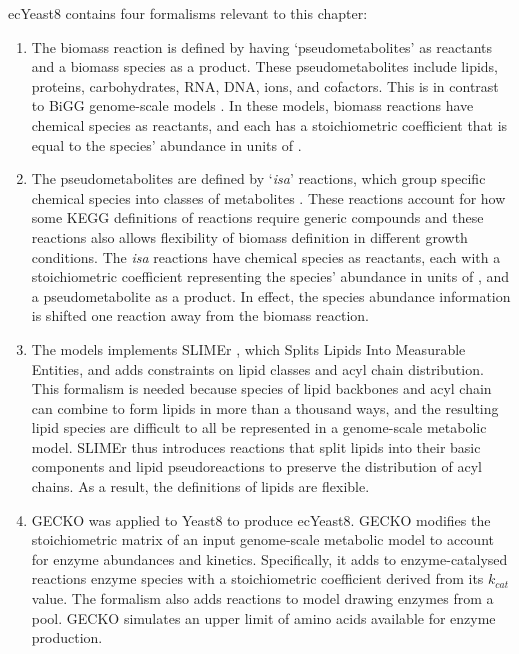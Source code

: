 ecYeast8 contains four formalisms relevant to this chapter:
\begin{enumerate}
  \item
        The biomass reaction is defined by having `pseudometabolites' as reactants and a biomass species as a product.
        These pseudometabolites include lipids, proteins, carbohydrates, RNA, DNA, ions, and cofactors.
        This is in contrast to BiGG genome-scale models \parencite{norsigianBiGGModels20202020}.
        In these models, biomass reactions have chemical species as reactants, and each has a stoichiometric coefficient that is equal to the species' abundance in units of \SI{}{\mmolgdw}.
  \item
        The pseudometabolites are defined by `\textit{isa}' reactions, which group specific chemical species into classes of metabolites \parencite{heavnerYeastExpandedReconstruction2012}.
        These reactions account for how some KEGG definitions of reactions require generic compounds and these reactions also allows flexibility of biomass definition in different growth conditions.
        The \textit{isa} reactions have chemical species as reactants, each with a stoichiometric coefficient representing the species' abundance in units of \SI{}{\mmolgdw}, and a pseudometabolite as a product.
        In effect, the species abundance information is shifted one reaction away from the biomass reaction.
  \item
        The models implements SLIMEr \parencite{sanchezSLIMErProbingFlexibility2019}, which Splits Lipids Into Measurable Entities, and adds constraints on lipid classes and acyl chain distribution.
        This formalism is needed because species of lipid backbones and acyl chain can combine to form lipids in more than a thousand ways, and the resulting lipid species are difficult to all be represented in a genome-scale metabolic model.
        SLIMEr thus introduces reactions that split lipids into their basic components and lipid pseudoreactions to preserve the distribution of acyl chains.
        As a result, the definitions of lipids are flexible.
  \item
        GECKO was applied to Yeast8 to produce ecYeast8.  GECKO modifies the stoichiometric matrix of an input genome-scale metabolic model to account for enzyme abundances and kinetics.
        Specifically, it adds to enzyme-catalysed reactions enzyme species with a stoichiometric coefficient derived from its $k_{cat}$ value.
        The formalism also adds reactions to model drawing enzymes from a pool.
        GECKO simulates an upper limit of amino acids available for enzyme production.
\end{enumerate}

